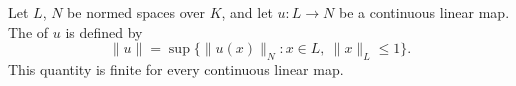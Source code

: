Let $L$, $N$ be normed spaces over $K$, and let $u: L \to N$ be a continuous linear map. The  of $u$ is defined by
$$\|u\| = \sup\{\|u(x)\|_N : x \in L,\ \|x\|_L \leq 1\}.$$
This quantity is finite for every continuous linear map.

